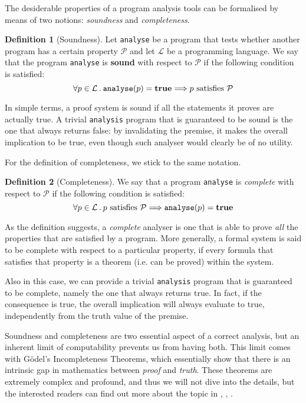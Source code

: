 \documentclass[12pt,a4paper]{book}
\newcommand{\st}{\hspace{2px}.\hspace{2px}}
\theoremstyle{definition}
\newtheorem{defn}{Definition}
\begin{document}
	The desiderable properties of a program analysis tools can be formalised by means of two notions: \textit{soundness} and \textit{completeness}.
	
	\begin{defn}[Soundness]
		Let \texttt{analyse} be a program that tests whether another program has a certain property $\mathcal{P}$ and let $\mathcal{L}$ be a programming language. We say that the program \texttt{analyse} is \textbf{sound} with respect to $\mathcal{P}$ if the following condition is satisfied:
		\[
		\forall p \in \mathcal{L} \st \text{\texttt{analyse}}(p) = \text{\textbf{true}} \Longrightarrow p \text{ satisfies } \mathcal{P}
		\]
	\end{defn}
	In simple terms, a proof system is sound if all the statements it proves are actually true. A trivial \texttt{analysis} program that is guaranteed to be sound is the one that always returns false: by invalidating the premise, it makes the overall implication to be true, even though such analyser would clearly be of no utility.
	
	For the definition of completeness, we stick to the same notation.
	\begin{defn}[Completeness]
		We say that a program \texttt{analyse} is \textit{complete} with respect to $\mathcal{P}$ if the following condition is satisfied:
		\[
		\forall p \in \mathcal{L} \st p \text{ satisfies } \mathcal{P} \Longrightarrow \text{\texttt{analyse}}(p) = \text{\textbf{true}} 
		\]
	\end{defn}
	As the definition suggests, a \textit{complete} analyser is one that is able to prove \textit{all} the properties that are satisfied by a program. More generally, a formal system is said to be complete with respect to a particular property, if every formula that satisfies that property is a theorem (i.e. can be proved) within the system.
	
	Also in this case, we can provide a trivial \texttt{analysis} program that is guaranteed to be complete, namely the one that always returns true. In fact, if the consequence is true, the overall implication will always evaluate to true, independently from the truth value of the premise.
	
	Soundness and completeness are two essential aspect of a correct analysis, but an inherent limit of computability prevents us from having both. This limit comes with Gödel's Incompleteness Theorems, which essentially show that there is an intrinsic gap in mathematics between \textit{proof} and \textit{truth}. These theorems are extremely complex and profound, and thus we will not dive into the details, but the interested readers can find out more about the topic in \cite{Odifreddi1989}, \cite{Rogers1987}, \cite{Hinman2007}.
\end{document}
